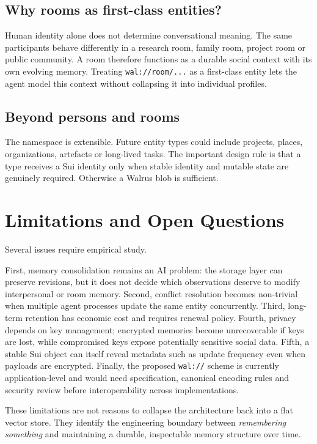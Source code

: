 \documentclass[11pt]{article}
\begin{document}
\subsection{Why rooms as first-class entities?}

Human identity alone does not determine conversational meaning. The same participants behave differently in a research room, family room, project room or public community. A room therefore functions as a durable social context with its own evolving memory. Treating \texttt{wal://room/...} as a first-class entity lets the agent model this context without collapsing it into individual profiles.

\subsection{Beyond persons and rooms}

The namespace is extensible. Future entity types could include projects, places, organizations, artefacts or long-lived tasks. The important design rule is that a type receives a Sui identity only when stable identity and mutable state are genuinely required. Otherwise a Walrus blob is sufficient.

\section{Limitations and Open Questions}

Several issues require empirical study.

First, memory consolidation remains an AI problem: the storage layer can preserve revisions, but it does not decide which observations deserve to modify interpersonal or room memory. Second, conflict resolution becomes non-trivial when multiple agent processes update the same entity concurrently. Third, long-term retention has economic cost and requires renewal policy. Fourth, privacy depends on key management; encrypted memories become unrecoverable if keys are lost, while compromised keys expose potentially sensitive social data. Fifth, a stable Sui object can itself reveal metadata such as update frequency even when payloads are encrypted. Finally, the proposed \texttt{wal://} scheme is currently application-level and would need specification, canonical encoding rules and security review before interoperability across implementations.

These limitations are not reasons to collapse the architecture back into a flat vector store. They identify the engineering boundary between \emph{remembering something} and maintaining a durable, inspectable memory structure over time.
\end{document}
